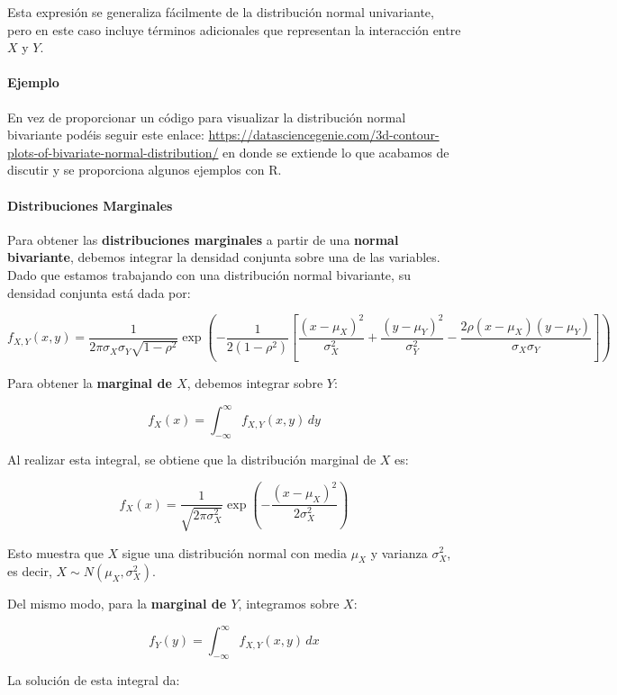 \documentclass[
]{article}
\begin{document}
Esta expresión se generaliza fácilmente de la distribución normal univariante, pero en este caso incluye términos adicionales que representan la interacción entre \(X\) y \(Y\).

\paragraph{Ejemplo}\label{ejemplo}

En vez de proporcionar un código para visualizar la distribución normal bivariante podéis seguir este enlace: \url{https://datasciencegenie.com/3d-contour-plots-of-bivariate-normal-distribution/} en donde se extiende lo que acabamos de discutir y se proporciona algunos ejemplos con R.

\paragraph{Distribuciones Marginales}\label{distribuciones-marginales-1}

Para obtener las \textbf{distribuciones marginales} a partir de una \textbf{normal bivariante}, debemos integrar la densidad conjunta sobre una de las variables. Dado que estamos trabajando con una distribución normal bivariante, su densidad conjunta está dada por:

\[
f_{X,Y}(x, y) = \frac{1}{2 \pi \sigma_X \sigma_Y \sqrt{1 - \rho^2}} \exp\left( -\frac{1}{2(1 - \rho^2)} \left[ \frac{(x - \mu_X)^2}{\sigma_X^2} + \frac{(y - \mu_Y)^2}{\sigma_Y^2} - \frac{2\rho(x - \mu_X)(y - \mu_Y)}{\sigma_X \sigma_Y} \right] \right)
\]

Para obtener la \textbf{marginal de \(X\)}, debemos integrar sobre \(Y\):

\[
f_X(x) = \int_{-\infty}^{\infty} f_{X,Y}(x, y) \, dy
\]

Al realizar esta integral, se obtiene que la distribución marginal de \(X\) es:

\[
f_X(x) = \frac{1}{\sqrt{2 \pi \sigma_X^2}} \exp\left( -\frac{(x - \mu_X)^2}{2 \sigma_X^2} \right)
\]

Esto muestra que \(X\) sigue una distribución normal con media \(\mu_X\) y varianza \(\sigma_X^2\), es decir, \(X \sim N(\mu_X, \sigma_X^2)\).

Del mismo modo, para la \textbf{marginal de \(Y\)}, integramos sobre \(X\):

\[
f_Y(y) = \int_{-\infty}^{\infty} f_{X,Y}(x, y) \, dx
\]

La solución de esta integral da:
\end{document}
